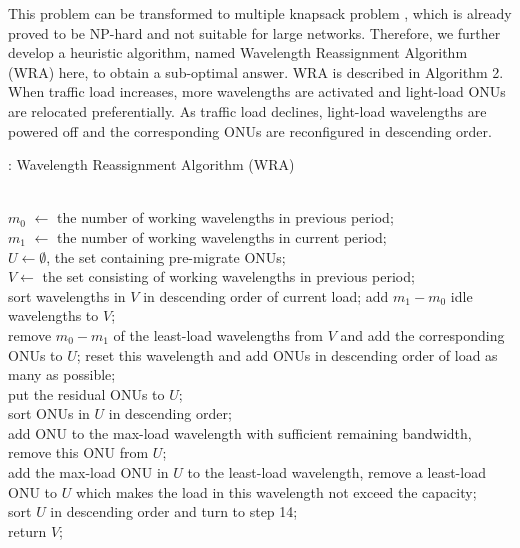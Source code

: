 \documentclass[letter]{IEEEtran}
\begin{document}
This problem can be transformed to multiple knapsack problem \cite{dawande2000approximation}, which is already proved to be NP-hard and not suitable for large networks. Therefore, we further develop a heuristic algorithm, named Wavelength Reassignment Algorithm (WRA) here, to obtain a sub-optimal answer. WRA is described in Algorithm 2. When traffic load increases, more wavelengths are activated and light-load ONUs are relocated preferentially. As traffic load declines, light-load wavelengths are powered off and the corresponding ONUs are reconfigured in descending order.

\begin{algorithm}[h]
    \scriptsize
	\caption{: Wavelength Reassignment Algorithm (WRA)}
	\begin{algorithmic}[1]
		\REQUIRE ~~\\
		$ m_{0} $ $ \leftarrow $ the number of working wavelengths in previous period;\\
		$ m_{1} $ $ \leftarrow $ the number of working wavelengths in current period;\\
	    $ U \leftarrow \emptyset$, the set containing pre-migrate ONUs;\\
	    $ V \leftarrow$ the set consisting of working wavelengths in previous period;\\
        \STATE sort wavelengths in $ V $ in descending order of current load;
	        \STATE add $ m_{1} - m_{0} $ idle wavelengths to $ V $;\\
        \ELSE
	        \STATE remove $ m_{0} - m_{1} $ of the least-load wavelengths from $ V $ and add the corresponding ONUs to $ U $;
	    \ENDIF
		        \STATE reset this wavelength and add ONUs in descending order of load as many as possible;\\
		        \STATE put the residual ONUs to $ U $;\\
		    \ENDIF
		\ENDFOR
		\STATE sort ONUs in $ U $ in descending order;\\
			\STATE add ONU to the max-load wavelength with sufficient remaining bandwidth, remove this ONU from $ U $;\\
		\ENDFOR
			\STATE add the max-load ONU in $ U $ to the least-load wavelength, remove a least-load ONU to $ U $ which makes the load in this wavelength not exceed the capacity;\\
			\STATE sort $U$ in descending order and turn to step 14;\\
		\ENDWHILE
		\STATE return $ V $;\\
	\end{algorithmic}
\end{algorithm}
\end{document}
